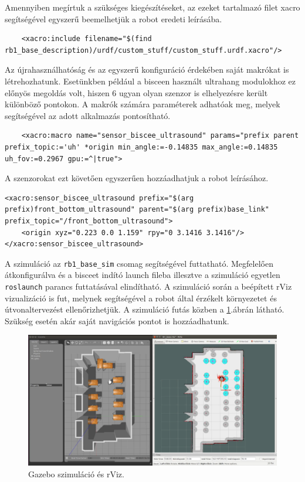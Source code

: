 
Amennyiben megírtuk a szükséges kiegészítéseket, az ezeket tartalmazó filet xacro segítségével egyszerű beemelhetjük a robot eredeti leírásába.
\begin{lstlisting}
    <xacro:include filename="$(find rb1_base_description)/urdf/custom_stuff/custom_stuff.urdf.xacro"/>
\end{lstlisting}
Az újrahasználhatóság és az egyszerű konfiguráció érdekében saját makrókat is létrehozhatunk. Esetünkben például a bisceen használt ultrahang modulokhoz ez előnyös megoldás volt, hiszen 6 ugyan olyan szenzor is elhelyezésre került különböző pontokon. A makrók számára paraméterek adhatóak meg, melyek segítségével az adott alkalmazás pontosítható.
\begin{lstlisting}
    <xacro:macro name="sensor_biscee_ultrasound" params="prefix parent prefix_topic:='uh' *origin min_angle:=-0.14835 max_angle:=0.14835 uh_fov:=0.2967 gpu:=^|true">
\end{lstlisting}
A szenzorokat ezt követően egyszerűen hozzáadhatjuk a robot leírásához.
\begin{lstlisting}
<xacro:sensor_biscee_ultrasound prefix="$(arg prefix)front_bottom_ultrasound" parent="$(arg prefix)base_link" prefix_topic="/front_bottom_ultrasound">
    <origin xyz="0.223 0.0 1.159" rpy="0 3.1416 3.1416"/>
</xacro:sensor_biscee_ultrasound>
\end{lstlisting}
A szimuláció az \lstinline{rb1_base_sim} csomag segítségével futtatható. Megfelelően átkonfigurálva és a bisceet indító launch fileba illesztve a szimuláció egyetlen \lstinline{roslaunch} parancs futtatásával elindítható. A szimuláció során a beépített rViz\cite{noauthor_rviz_nodate} vizualizáció is fut, melynek segítségével a robot által érzékelt környezetet és útvonaltervezést ellenőrizhetjük. A szimuláció futás közben a \ref{fig:simulation_gazebo_and_rviz}.ábrán látható. Szükség esetén akár saját navigációs pontot is hozzáadhatunk.

\begin{figure}
    \centering
    \includegraphics[width=\linewidth]{figures/simulation_gazebo_and_rviz.png}
    \caption{Gazebo szimuláció és rViz.}
    \label{fig:simulation_gazebo_and_rviz}
\end{figure}


